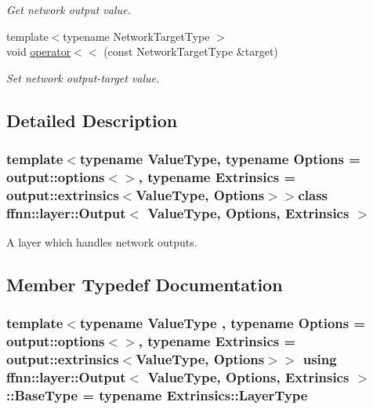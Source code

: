 \begin{DoxyCompactItemize}
\begin{DoxyCompactList}\small\item\em Get network output value. \end{DoxyCompactList}\item 
{\footnotesize template$<$typename Network\-Target\-Type $>$ }\\void \hyperlink{classffnn_1_1layer_1_1_output_a47b53447b900079a0cb6f0b29acd350e}{operator$<$$<$} (const Network\-Target\-Type \&target)
\begin{DoxyCompactList}\small\item\em Set network output-\/target value. \end{DoxyCompactList}\end{DoxyCompactItemize}


\subsection{Detailed Description}
\subsubsection*{template$<$typename Value\-Type, typename Options = output\-::options$<$$>$, typename Extrinsics = output\-::extrinsics$<$\-Value\-Type, Options$>$$>$class ffnn\-::layer\-::\-Output$<$ Value\-Type, Options, Extrinsics $>$}

A layer which handles network outputs. 

\subsection{Member Typedef Documentation}
\hypertarget{classffnn_1_1layer_1_1_output_a9f60142c3e464fcc6cda5203895dc448}{
\subsubsection[{Base\-Type}]{\setlength{\rightskip}{0pt plus 5cm}template$<$typename Value\-Type , typename Options  = output\-::options$<$$>$, typename Extrinsics  = output\-::extrinsics$<$\-Value\-Type, Options$>$$>$ using {\bf ffnn\-::layer\-::\-Output}$<$ Value\-Type, Options, Extrinsics $>$\-::{\bf Base\-Type} =  typename Extrinsics\-::\-Layer\-Type}}\label{classffnn_1_1layer_1_1_output_a9f60142c3e464fcc6cda5203895dc448}


